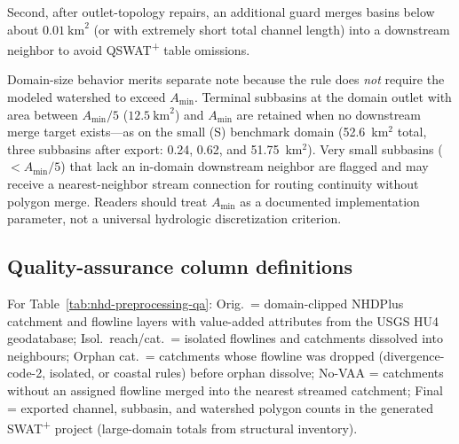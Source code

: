 Second, after outlet-topology repairs, an additional guard merges basins below about $0.01~\mathrm{km}^2$ (or with extremely short total channel length) into a downstream neighbor to avoid QSWAT\textsuperscript{+} table omissions.

Domain-size behavior merits separate note because the rule does \emph{not} require the modeled watershed to exceed $A_{\min}$.
Terminal subbasins at the domain outlet with area between $A_{\min}/5$ ($12.5~\mathrm{km}^2$) and $A_{\min}$ are retained when no downstream merge target exists---as on the small (S) benchmark domain (52.6~km$^2$ total, three subbasins after export: 0.24, 0.62, and 51.75~km$^2$).
Very small subbasins ($<A_{\min}/5$) that lack an in-domain downstream neighbor are flagged and may receive a nearest-neighbor stream connection for routing continuity without polygon merge.
Readers should treat $A_{\min}$ as a documented implementation parameter, not a universal hydrologic discretization criterion.

\subsection{Quality-assurance column definitions}
For Table~\ref{tab:nhd-preprocessing-qa}: Orig.\ = domain-clipped NHDPlus catchment and flowline layers with value-added attributes from the USGS HU4 geodatabase; Isol.\ reach/cat.\ = isolated flowlines and catchments dissolved into neighbours; Orphan cat.\ = catchments whose flowline was dropped (divergence-code-2, isolated, or coastal rules) before orphan dissolve; No-VAA = catchments without an assigned flowline merged into the nearest streamed catchment; Final = exported channel, subbasin, and watershed polygon counts in the generated SWAT\textsuperscript{+} project (large-domain totals from structural inventory).
